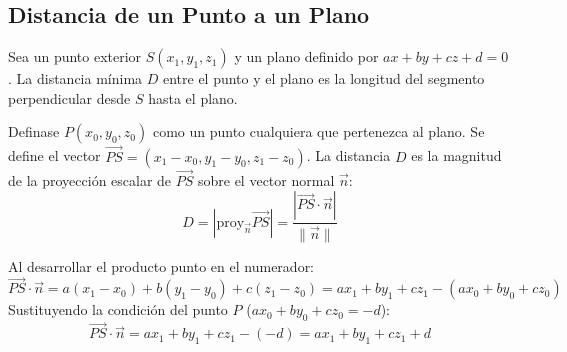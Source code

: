 \begin{center}
\shorthandoff{>}
\end{center}

\subsection{Distancia de un Punto a un Plano}

Sea un punto exterior $S(x_1, y_1, z_1)$ y un plano definido por $ax + by + cz + d = 0$. La distancia mínima $D$ entre el punto y el plano es la longitud del segmento perpendicular desde $S$ hasta el plano.

Definase $P(x_0, y_0, z_0)$ como un punto cualquiera que pertenezca al plano. Se define el vector $\vec{PS} = (x_1-x_0, y_1-y_0, z_1-z_0)$.
La distancia $D$ es la magnitud de la proyección escalar de $\vec{PS}$ sobre el vector normal $\vec{n}$:
$$ D = |\text{proy}_{\vec{n}} \vec{PS}| = \frac{|\vec{PS} \cdot \vec{n}|}{\|\vec{n}\|} $$



Al desarrollar el producto punto en el numerador:
$$ \vec{PS} \cdot \vec{n} = a(x_1-x_0) + b(y_1-y_0) + c(z_1-z_0) = ax_1 + by_1 + cz_1 - (ax_0 + by_0 + cz_0) $$
Sustituyendo la condición del punto $P$ ($ax_0 + by_0 + cz_0 = -d$):
$$ \vec{PS} \cdot \vec{n} = ax_1 + by_1 + cz_1 - (-d) = ax_1 + by_1 + cz_1 + d $$

